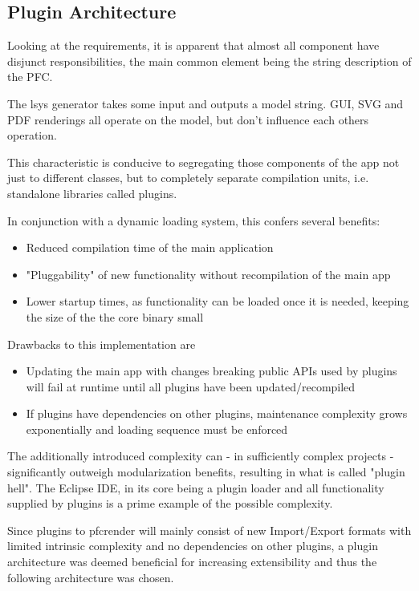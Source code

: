 \subsection{Plugin Architecture}
Looking at the requirements, it is apparent that almost all component have disjunct responsibilities, the main common element being the string description of the PFC.

The \gls{lsys} generator takes some input and outputs a model string. GUI, SVG and PDF renderings all operate on the model, but don't influence each others operation.

This characteristic is conducive to segregating those components of the app not just to different classes, but to completely separate compilation units, i.e. standalone libraries called plugins.

In conjunction with a dynamic loading system, this confers several benefits:

\begin{itemize}
	\item  Reduced compilation time of the main application
	\item  "Pluggability" of new functionality without recompilation of the main app
	\item  Lower startup times, as functionality can be loaded once it is needed, keeping the size of the the core binary small
\end{itemize}

Drawbacks to this implementation are
\begin{itemize}
	\item Updating the main app with changes breaking public APIs used by plugins will fail at runtime until all plugins have been updated/recompiled
	\item If plugins have dependencies on other plugins, maintenance complexity grows exponentially and loading sequence must be enforced
\end{itemize}

The additionally introduced complexity can - in sufficiently complex projects - significantly outweigh modularization benefits, resulting in what is called "plugin hell".
The Eclipse IDE, in its core being a plugin loader and all functionality supplied by plugins is a prime example of the possible complexity.

Since plugins to pfcrender will mainly consist of new Import/Export formats with limited intrinsic complexity and no dependencies on other plugins, a plugin architecture was deemed beneficial for increasing extensibility and thus the following architecture was chosen.

